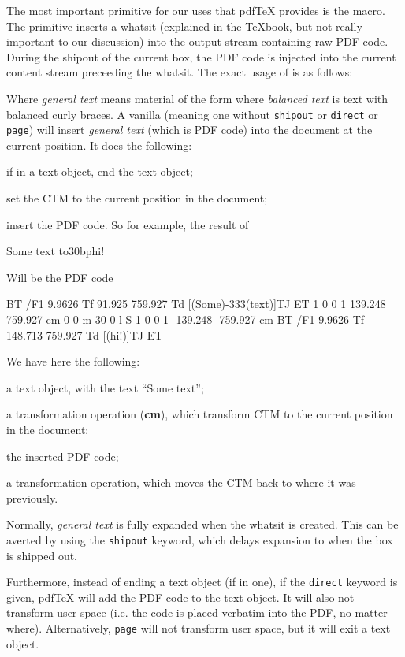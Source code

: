 The most important primitive for our uses that pdf\TeX{} provides is the \macro\pdfliteral{} macro.
The \macro\pdfliteral{} primitive inserts a whatsit (explained in the \TeX book, but not really important to
our discussion) into the output stream containing raw PDF code.
During the shipout of the current box, the PDF code is injected into the current content stream preceeding
the whatsit.
The exact usage of \macro\pdfliteral{} is as follows:


Where {\it general text} means material of the form  where {\it balanced
text} is text with balanced curly braces.
A vanilla \macro\pdfliteral{} (meaning one without {\tt shipout} or {\tt direct} or {\tt page}) will insert
{\it general text} (which is PDF code) into the document at the current position.
It does the following:
\benum
    \item if in a text object, end the text object;
    \item set the CTM to the current position in the document;
    \item insert the PDF code.
\eenum
So for example, the result of

\blisting
Some text \hbox to30bp{\hfil hi!\hfil}
\elisting

Will be the PDF code

\blisting {}
BT
/F1 9.9626 Tf 91.925 759.927 Td [(Some)-333(text)]TJ
ET
1 0 0 1 139.248 759.927 cm
0 0 m 30 0 l S
1 0 0 1 -139.248 -759.927 cm
BT
/F1 9.9626 Tf 148.713 759.927 Td [(hi!)]TJ
ET
\elisting

\noindent We have here the following:
\benum
    \item a text object, with the text ``Some text'';
    \item a transformation operation ({\bf cm}), which transform CTM to the current position in the document;
    \item the inserted PDF code;
    \item a transformation operation, which moves the CTM back to where it was previously.
\eenum

Normally, {\it general text} is fully expanded when the whatsit is created.
This can be averted by using the {\tt shipout} keyword, which delays expansion to when the box is shipped out.

Furthermore, instead of ending a text object (if in one), if the {\tt direct} keyword is given, pdf\TeX{} will
add the PDF code to the text object.
It will also not transform user space (i.e. the code is placed verbatim into the PDF, no matter where).
Alternatively, {\tt page} will not transform user space, but it will exit a text object.

